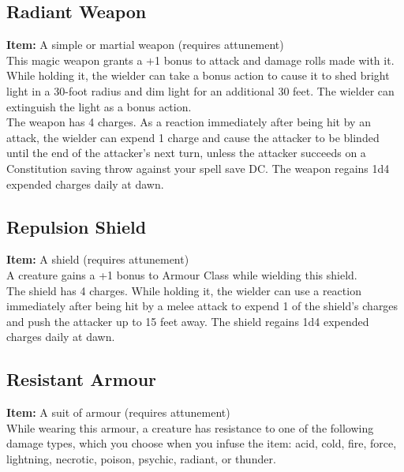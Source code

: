 \documentclass[11pt, A4paper, english]{article}
\begin{document}
		\subsection{Radiant Weapon}
\textbf{Item:} A simple or martial weapon (requires attunement) \\
This magic weapon grants a +1 bonus to attack and damage rolls made with it. While holding it, the wielder can take a bonus action to cause it to shed bright light in a 30-foot radius and dim light for an additional 30 feet. The wielder can extinguish the light as a bonus action. \\
The weapon has 4 charges. As a reaction immediately after being hit by an attack, the wielder can expend 1 charge and cause the attacker to be blinded until the end of the attacker's next turn, unless the attacker succeeds on a Constitution saving throw against your spell save DC. The weapon regains 1d4 expended charges daily at dawn.

		\subsection{Repulsion Shield}
\textbf{Item:} A shield (requires attunement) \\
A creature gains a +1 bonus to Armour Class while wielding this shield. \\
The shield has 4 charges. While holding it, the wielder can use a reaction immediately after being hit by a melee attack to expend 1 of the shield's charges and push the attacker up to 15 feet away. The shield regains 1d4 expended charges daily at dawn.

		\subsection{Resistant Armour}
\textbf{Item:} A suit of armour (requires attunement) \\
While wearing this armour, a creature has resistance to one of the following damage types, which you choose when you infuse the item: acid, cold, fire, force, lightning, necrotic, poison, psychic, radiant, or thunder.
\end{document}
